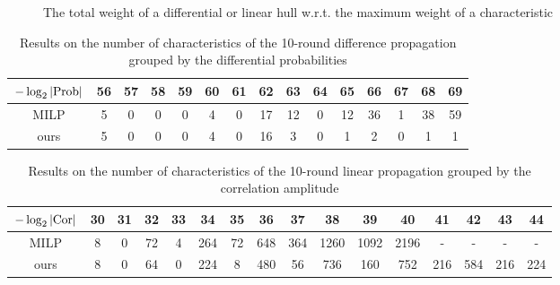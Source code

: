\begin{figure}[htbp]
	\centering
	\caption{The total weight of a differential or linear hull w.r.t. the maximum weight of a characteristic }
	\quad
	
\end{figure}

\begin{table}
	\caption{Results on the number of characteristics of the 10-round difference propagation grouped by the differential probabilities}\label{tab:num-diff}
	\centering
	\begin{tabular}{|c|c|c|c|c|c|c|c|c|c|c|c|c|c|c|}
		\hline
		$-\log_2|\text{Prob}|$ & 56 & 57 & 58 & 59 & 60 & 61 & 62 & 63 & 64 & 65 & 66 & 67 & 68 & 69 \\
		\hline
		MILP & 5 & 0 & 0 & 0 & 4 & 0 & 17 & 12 & 0 & 12 & 36 & 1 & 38 & 59 \\
		\hline
		ours & 5 & 0 & 0 & 0 & 4 & 0 & 16 & 3 & 0 & 1 & 2 & 0 & 1 & 1\\
		\hline
	\end{tabular}
\end{table}

\begin{table}
	\caption{Results on the number of characteristics of the 10-round linear propagation grouped by the correlation amplitude}\label{tab:num-linear}
	\centering
	\begin{tabular}{|c|c|c|c|c|c|c|c|c|c|c|c|c|c|c|c|}
		\hline
		$-\log_2|\text{Cor}|$ & 30 & 31 & 32 & 33 & 34 & 35 & 36 & 37 & 38 & 39 & 40 & 41 & 42 & 43 & 44\\
		\hline
		MILP & 8 & 0 & 72 & 4 & 264 & 72 & 648 & 364 & 1260 & 1092 & 2196 & - & - & - & - \\
		\hline
		ours & 8 & 0 & 64 & 0 & 224 & 8 & 480 & 56 & 736 & 160 & 752 & 216 & 584 & 216 & 224 \\
		\hline
	\end{tabular}
\end{table}



